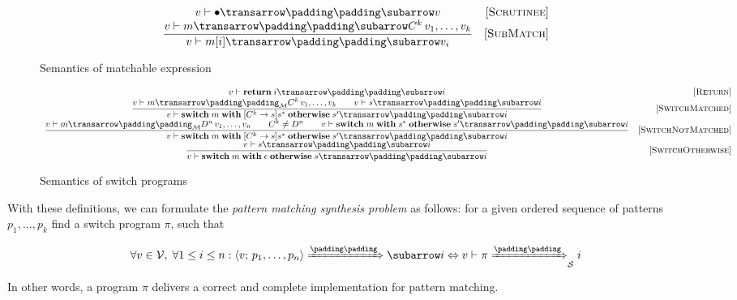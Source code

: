 \begin{figure}
  \renewcommand*{\arraystretch}{2}
  \setarrow{\xRightarrow}
  \[
  \begin{array}{cr}
    \withenv{v}{\trans{\bullet}{}{v}} & \ruleno{Scrutinee} \\
    \trule{\withenv{v}{\trans{m}{}{C^k\,v_1,\dots,v_k}}}{\withenv{v}{\trans{m[i]}{}{v_i}}} & \ruleno{SubMatch} 
  \end{array}
  \]
  \caption{Semantics of matchable expression}
  \label{fig:matchexpr}
\end{figure}


\begin{figure}
  \renewcommand*{\arraystretch}{3}
  \setarrow{\xRightarrow}
  \[
  \begin{array}{cr}
    \withenv{v}{\trans{\primi{return}\;i}{}{i}} & \ruleno{Return}\\
    \trule{{\setsubarrow{_{\mathcal M}}\withenv{v}{\trans{m}{}{C^k\,v_1,\dots,v_k}}}\qquad \withenv{v}{\trans{s}{}{i}}}
          {\withenv{v}{\trans{\primi{switch}\;m\;\primi{with}\;[C^k\to s]s^*\;\primi{otherwise}\;s^\prime}{}{i}}} & \ruleno{SwitchMatched}\\
    \trule{{\setsubarrow{_{\mathcal M}}\withenv{v}{\trans{m}{}{D^n\,v_1,\dots,v_n}}}\qquad C^k\ne D^n\qquad \withenv{v}{\trans{\primi{switch}\;m\;\primi{with}\;s^*\;\primi{otherwise}\;s^\prime}{}{i}}}
          {\withenv{v}{\trans{\primi{switch}\;m\;\primi{with}\;[C^k\to s]s^*\;\primi{otherwise}\;s^\prime}{}{i}}} & \ruleno{SwitchNotMatched}\\
    \trule{\withenv{v}{\trans{s}{}{i}}}{\withenv{v}{\trans{\primi{switch}\;m\;\primi{with}\;\epsilon\;\primi{otherwise}\;s}{}{i}}} & \ruleno{SwitchOtherwise}
  \end{array}
  \]
  \caption{Semantics of switch programs}
  \label{fig:test-and-branch}
\end{figure}

With these definitions, we can formulate the \emph{pattern matching synthesis problem} as follows: for a given ordered sequence of patterns $p_1,\dots,p_k$ find
a switch program $\pi$, such that

\[
\setarrow{\xRightarrow}
\forall v\in \mathcal V,\; \forall 1\le i\le n : \trans{\inbr{v;\,p_1,\dots,p_n}}{}{i}\Leftrightarrow{\setsubarrow{_{\mathcal S}}\withenv{v}{\trans{\pi}{}{i}}}
\]

In other words, a program $\pi$ delivers a correct and complete implementation for pattern matching.
